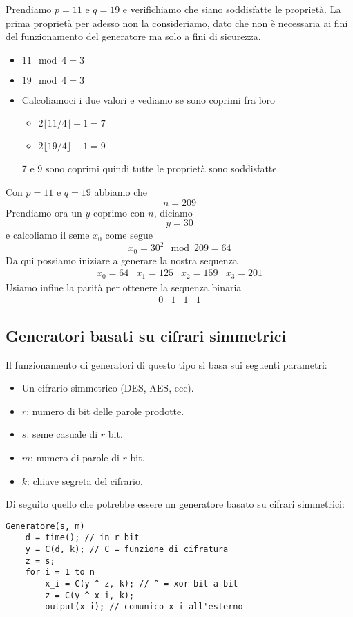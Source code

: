 \begin{example}
	Prendiamo $p = 11$ e $q = 19$ e verifichiamo che siano soddisfatte le propriet\`a. La prima propriet\`a per adesso
	non la consideriamo, dato che non \`e necessaria ai fini del funzionamento del generatore ma solo a fini di sicurezza.
	\begin{itemize}
		\item $11 \mod{4} = 3$
		\item $19 \mod{4} = 3$
		\item Calcoliamoci i due valori e vediamo se sono coprimi fra loro
		      \begin{itemize}
			      \item $2 \lfloor 11 / 4 \rfloor + 1 = 7$
			      \item $2 \lfloor 19 / 4 \rfloor + 1 = 9$
		      \end{itemize}
		      7 e 9 sono coprimi quindi tutte le propriet\`a sono soddisfatte.
	\end{itemize}
	Con $p = 11$ e $q = 19$ abbiamo che
	\[ n = 209 \]
	Prendiamo ora un $y$ coprimo con $n$, diciamo
	\[ y = 30 \]
	e calcoliamo il seme $x_0$ come segue
	\[ x_0 = 30^2 \mod{209} = 64 \]
	Da qui possiamo iniziare a generare la nostra sequenza
	\[ \begin{matrix} x_0 = 64 & x_1 = 125 & x_2 = 159 & x_3 = 201 \end{matrix} \]
	Usiamo infine la parit\`a per ottenere la sequenza binaria
	\[ \begin{matrix} 0 & 1 & 1 & 1 \end{matrix} \]
\end{example}

\subsection{Generatori basati su cifrari simmetrici}
Il funzionamento di generatori di questo tipo si basa sui seguenti parametri:
\begin{itemize}
	\item Un cifrario simmetrico (DES, AES, ecc).
	\item $r$: numero di bit delle parole prodotte.
	\item $s$: seme casuale di $r$ bit.
	\item $m$: numero di parole di $r$ bit.
	\item $k$: chiave segreta del cifrario.
\end{itemize}
Di seguito quello che potrebbe essere un generatore basato su cifrari simmetrici:
\begin{lstlisting}[style=pseudo-style]
Generatore(s, m)
	d = time(); // in r bit 
	y = C(d, k); // C = funzione di cifratura 
	z = s;
	for i = 1 to n
		x_i = C(y ^ z, k); // ^ = xor bit a bit
		z = C(y ^ x_i, k);
		output(x_i); // comunico x_i all'esterno
\end{lstlisting}